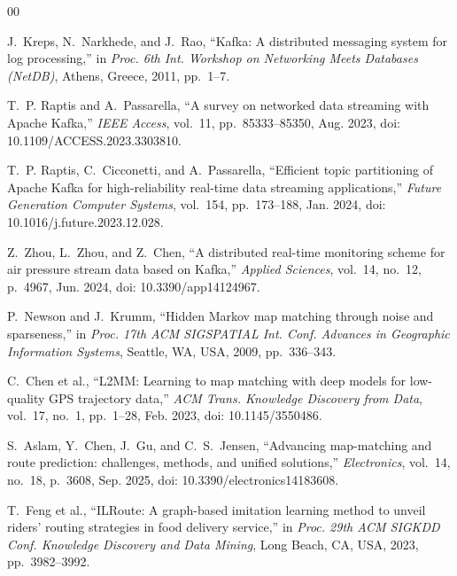\documentclass[conference]{IEEEtran}
\begin{document}

\begin{thebibliography}{00}


J.~Kreps, N.~Narkhede, and J.~Rao,
``Kafka: A distributed messaging system for log processing,''
in \textit{Proc. 6th Int. Workshop on Networking Meets Databases
(NetDB)}, Athens, Greece, 2011, pp.~1--7.

T.~P. Raptis and A.~Passarella,
``A survey on networked data streaming with Apache Kafka,''
\textit{IEEE Access}, vol.~11, pp.~85333--85350, Aug. 2023,
doi: 10.1109/ACCESS.2023.3303810.

T.~P. Raptis, C.~Cicconetti, and A.~Passarella,
``Efficient topic partitioning of Apache Kafka for high-reliability
real-time data streaming applications,''
\textit{Future Generation Computer Systems}, vol.~154,
pp.~173--188, Jan. 2024,
doi: 10.1016/j.future.2023.12.028.

Z.~Zhou, L.~Zhou, and Z.~Chen,
``A distributed real-time monitoring scheme for air pressure stream data
based on Kafka,''
\textit{Applied Sciences}, vol.~14, no.~12, p.~4967, Jun. 2024,
doi: 10.3390/app14124967.


P.~Newson and J.~Krumm,
``Hidden Markov map matching through noise and sparseness,''
in \textit{Proc. 17th ACM SIGSPATIAL Int. Conf. Advances in
Geographic Information Systems}, Seattle, WA, USA, 2009,
pp.~336--343.

C.~Chen et al.,
``L2MM: Learning to map matching with deep models for low-quality GPS
trajectory data,''
\textit{ACM Trans. Knowledge Discovery from Data}, vol.~17, no.~1,
pp.~1--28, Feb. 2023,
doi: 10.1145/3550486.

S.~Aslam, Y.~Chen, J.~Gu, and C.~S.~Jensen,
``Advancing map-matching and route prediction: challenges, methods, and
unified solutions,''
\textit{Electronics}, vol.~14, no.~18, p.~3608, Sep. 2025,
doi: 10.3390/electronics14183608.

T.~Feng et al.,
``ILRoute: A graph-based imitation learning method to unveil riders'
routing strategies in food delivery service,''
in \textit{Proc. 29th ACM SIGKDD Conf. Knowledge Discovery and
Data Mining}, Long Beach, CA, USA, 2023, pp.~3982--3992.


\end{thebibliography}
\end{document}
